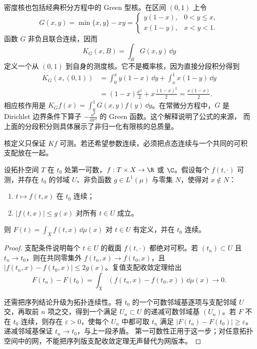 \begin{example}
密度核也包括经典积分方程中的 Green 型核。在区间 $(0,1)$ 上令
\[
 G(x,y)=\min\{x,y\}-xy
 =\begin{cases}
   y(1-x),&0<y\le x,\\
   x(1-y),&x<y<1.
  \end{cases}
\]
函数 $G$ 非负且联合连续，因而
\[
 K_G(x,B)=\int_B G(x,y)\,\dd y
\]
定义一个从 $(0,1)$ 到自身的测度核。它不是概率核，因为直接分段积分得到
\[
\begin{aligned}
 K_G(x,(0,1))
 &=\int_0^x y(1-x)\,\dd y+\int_x^1x(1-y)\,\dd y\\
 &=(1-x)\frac{x^2}{2}+x\frac{(1-x)^2}{2}
 =\frac{x(1-x)}2.
\end{aligned}
\]
相应核作用是 $K_Gf(x)=\int_0^1G(x,y)f(y)\,\dd y$。在常微分方程中，$G$ 是
Dirichlet 边界条件下算子 $-\frac{\dd^2}{\dd x^2}$ 的 Green 函数。这个解释说明了公式的来源，
而上面的分段积分则具体展示了非归一化有限核的总质量。
\end{example}

核定义只保证 $Kf$ 可测。若还希望参数连续，必须把点态连续与一个共同的可积支配放在一起。

\begin{theorem}[参数连续积分]\label{theorem:3-2-3-3}
设拓扑空间 $T$ 在 $t_0$ 处第一可数，$f:T\times X\to\R$ 或 $\C$。假设每个
$f(t,\cdot)$ 可测，并存在 $t_0$ 的邻域 $U$、非负函数 $g\in L^1(\mu)$ 与零集 $N$，使得对
$x\notin N$：
\begin{enumerate}
  \item $t\mapsto f(t,x)$ 在 $t_0$ 连续；
  \item $|f(t,x)|\le g(x)$ 对所有 $t\in U$ 成立。
\end{enumerate}
则 $F(t)=\int_Xf(t,x)\,\dd\mu(x)$ 对 $t\in U$ 有定义，并在 $t_0$ 连续。
\end{theorem}

\begin{proof}
支配条件说明每个 $t\in U$ 的截面 $f(t,\cdot)$ 都绝对可积。若 $(t_n)\subset U$ 且
$t_n\to t_0$，则在共同零集外
$f(t_n,x)\to f(t_0,x)$，且
$|f(t_n,x)-f(t_0,x)|\le2g(x)$。复值支配收敛定理给出
\[
 F(t_n)-F(t_0)=\int_X(f(t_n,x)-f(t_0,x))\,\dd\mu(x)\longrightarrow0.
\]

还需把序列结论升级为拓扑连续性。将 $t_0$ 的一个可数邻域基逐项与支配邻域
$U$ 交，再取前 $n$ 项之交，得到一个满足 $U_n\subset U$ 的递减可数邻域基
$(U_n)$。若 $F$ 不在
$t_0$ 连续，则存在 $\varepsilon>0$，使每个 $U_n$ 中都可取 $t_n$ 满足
$|F(t_n)-F(t_0)|\ge\varepsilon$。递减邻域基保证 $t_n\to t_0$，与上一段矛盾。
第一可数性正用于这一步；对任意拓扑空间中的网，不能把序列版支配收敛定理无声替代为网版本。
\end{proof}

